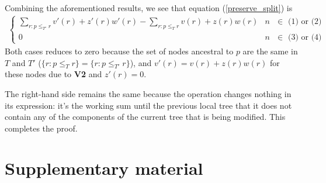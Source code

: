 Combining the aforementioned results, we see that equation (\ref{preserve_split}) is 
\begin{align}
    \begin{cases}
        \sum_{r: p \le_{T'} r} v'(r) + z'(r)w'(r) - \sum_{r: p \le_{T} r} v(r) + z(r)w(r) & \text{$n$ $\in$ (1) or (2)} \\
        0 & \text{$n$ $\in$ (3) or (4)}
    \end{cases} 
\end{align}
Both cases reduces to zero because the set of nodes ancestral to $p$ are the same in $T$ and $T'$ ($\{r: p \le_T r\}=\{r: p \le_{T'} r\}$), 
 and $v'(r) = v(r) + z(r)w(r)$ for these nodes due to \textbf{V2} and $z'(r)=0$. 

The right-hand side remains the same because the operation changes nothing in its expression:
it's the working sum until the previous local tree that it does not contain any of 
the components of the current tree that is being modified.
This completes the proof.



\setcounter{table}{0}
\renewcommand{\thetable}{S\arabic{table}}
\setcounter{figure}{0}
\renewcommand{\thefigure}{S\arabic{figure}}
\setcounter{section}{1}
\renewcommand \thesection{S\arabic{section}}

\section*{Supplementary material}




